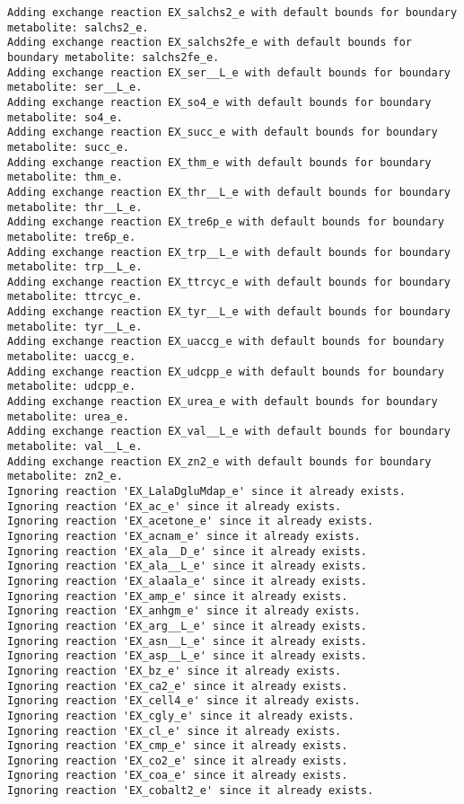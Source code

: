 \documentclass[
  letterpaper,
  DIV=11,
  numbers=noendperiod]{scrartcl}
\begin{document}
\begin{verbatim}
Adding exchange reaction EX_salchs2_e with default bounds for boundary metabolite: salchs2_e.
Adding exchange reaction EX_salchs2fe_e with default bounds for boundary metabolite: salchs2fe_e.
Adding exchange reaction EX_ser__L_e with default bounds for boundary metabolite: ser__L_e.
Adding exchange reaction EX_so4_e with default bounds for boundary metabolite: so4_e.
Adding exchange reaction EX_succ_e with default bounds for boundary metabolite: succ_e.
Adding exchange reaction EX_thm_e with default bounds for boundary metabolite: thm_e.
Adding exchange reaction EX_thr__L_e with default bounds for boundary metabolite: thr__L_e.
Adding exchange reaction EX_tre6p_e with default bounds for boundary metabolite: tre6p_e.
Adding exchange reaction EX_trp__L_e with default bounds for boundary metabolite: trp__L_e.
Adding exchange reaction EX_ttrcyc_e with default bounds for boundary metabolite: ttrcyc_e.
Adding exchange reaction EX_tyr__L_e with default bounds for boundary metabolite: tyr__L_e.
Adding exchange reaction EX_uaccg_e with default bounds for boundary metabolite: uaccg_e.
Adding exchange reaction EX_udcpp_e with default bounds for boundary metabolite: udcpp_e.
Adding exchange reaction EX_urea_e with default bounds for boundary metabolite: urea_e.
Adding exchange reaction EX_val__L_e with default bounds for boundary metabolite: val__L_e.
Adding exchange reaction EX_zn2_e with default bounds for boundary metabolite: zn2_e.
Ignoring reaction 'EX_LalaDgluMdap_e' since it already exists.
Ignoring reaction 'EX_ac_e' since it already exists.
Ignoring reaction 'EX_acetone_e' since it already exists.
Ignoring reaction 'EX_acnam_e' since it already exists.
Ignoring reaction 'EX_ala__D_e' since it already exists.
Ignoring reaction 'EX_ala__L_e' since it already exists.
Ignoring reaction 'EX_alaala_e' since it already exists.
Ignoring reaction 'EX_amp_e' since it already exists.
Ignoring reaction 'EX_anhgm_e' since it already exists.
Ignoring reaction 'EX_arg__L_e' since it already exists.
Ignoring reaction 'EX_asn__L_e' since it already exists.
Ignoring reaction 'EX_asp__L_e' since it already exists.
Ignoring reaction 'EX_bz_e' since it already exists.
Ignoring reaction 'EX_ca2_e' since it already exists.
Ignoring reaction 'EX_cell4_e' since it already exists.
Ignoring reaction 'EX_cgly_e' since it already exists.
Ignoring reaction 'EX_cl_e' since it already exists.
Ignoring reaction 'EX_cmp_e' since it already exists.
Ignoring reaction 'EX_co2_e' since it already exists.
Ignoring reaction 'EX_coa_e' since it already exists.
Ignoring reaction 'EX_cobalt2_e' since it already exists.

\end{verbatim}
\end{document}
